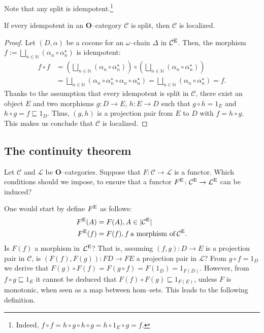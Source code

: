 Note that any split is idempotent.\footnote{Indeed, \(f \circ f = h \circ g \circ h \circ g = h \circ 1_E \circ g = f\).}

\begin{prp}
  If every idempotent in an \(\mathbf{O}\)--category \(\mathcal{C}\) is split, then \(\mathcal{C}\) is localized.
\end{prp}
\begin{proof}
  Let \((D,\alpha)\) be a cocone for an \(\omega{}\)--chain \(\Delta\) in \(\mathcal{C}^\textup{E}\). %
  Then, the morphism \(f := \bigsqcup_{n \in \mathbb{N}}(\alpha_n \circ \alpha_n^\star)\) is idempotent:
  \begin{equation*}
    \begin{split}
      f \circ f &= (\bigsqcup_{n \in \mathbb{N}}(\alpha_n \circ \alpha_n^\star)) \circ (\bigsqcup_{n \in \mathbb{N}}(\alpha_n \circ \alpha_n^\star)) \\
      &= \bigsqcup_{n \in \mathbb{N}}(\alpha_n \circ \alpha_n^\star \circ \alpha_n \circ \alpha_n^\star)
      = \bigsqcup_{n \in \mathbb{N}}(\alpha_n \circ \alpha_n^\star) = f.
    \end{split}
  \end{equation*}
  Thanks to the assumption that every idempotent is split in \(\mathcal{C}\), there exist an object \(E\) and two morphisms \(g \colon D \to E\), \(h \colon E \to D\) such that \(g \circ h = 1_E\) and \(h \circ g = f \sqsubseteq 1_D\).
  Thus, \((g,h)\) is a projection pair from \(E\) to \(D\) with \(f = h \circ g\).
  This makes us conclude that \(\mathcal{C}\) is localized.
\end{proof}

\subsection{The continuity theorem}

Let \(\mathcal{C}\) and \(\mathcal{L}\) be \(\mathbf{O}\)--categories. Suppose that \(F \colon \mathcal{C} \to \mathcal{L}\) is a functor.
Which conditions should we impose, to ensure that a functor \(F^\textup{E} \colon \mathcal{C}^\textup{E} \to \mathcal{L}^\textup{E}\) can be induced?

One would start by define \(F^\textup{E}\) as follows:
\begin{align*}
  F^\textup{E}(A) &= F(A), A \in \lvert \mathcal{C}^\textup{E} \rvert \\
  F^\textup{E}(f) &= F(f), f\:\text{a morphism of}\:\mathcal{C}^\textup{E}.
\end{align*}
Is \(F(f)\) a morphism in \(\mathcal{L}^\textup{E}\)?
That is, assuming \((f,g) \colon D \to E\) is a projection pair in \(\mathcal{C}\), is \((F(f),F(g)) \colon FD \to FE\) a projection pair in \(\mathcal{L}\)?
From \(g \circ f = 1_D\) we derive that \(F(g) \circ F(f) = F(g \circ f) = F(1_D) = 1_{F(D)}\).
However, from \(f \circ g \sqsubseteq 1_E\) it cannot be deduced that \(F(f) \circ F(g) \sqsubseteq 1_{F(E)}\), unless \(F\) is monotonic, when seen as a map between hom--sets. %
This leads to the following definition.


